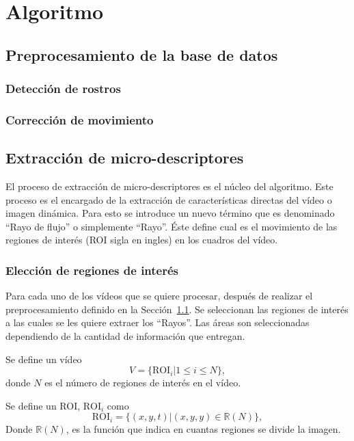 \chapter[Algoritmo]{Algoritmo}
\label{ch:algoritmo}

\section{Preprocesamiento de la base de datos}
\label{sec:proc_bdd}
	\subsection{Detección de rostros}
	\label{algoritmo:det_rostro}
	
	\subsection{Corrección de movimiento}
	\label{algoritmo:cor_movimiento}

\section{Extracción de micro-descriptores}
\label{sec:micro-descriptores}
		El proceso de extracción de micro-descriptores es el núcleo del algoritmo. Este proceso es el encargado de la extracción de características directas del vídeo o imagen dinámica. Para esto se introduce un nuevo término que es denominado ``Rayo de flujo'' o simplemente ``Rayo''. Éste define cual es el movimiento de las regiones de interés (ROI sigla en ingles) en los cuadros del vídeo.

	\subsection{Elección de regiones de interés}
	\label{algoritmo:elecc_roi}
	Para cada uno de los vídeos que se quiere procesar, después de realizar el preprocesamiento definido en la Sección~\ref{sec:proc_bdd}. Se seleccionan las regiones de interés a las cuales se les quiere extraer los ``Rayos''. Las áreas son seleccionadas dependiendo de la cantidad de información que entregan. 
	
	Se define un vídeo 
	\begin{equation}\label{algoritmo:eq:video}		
		V = \{\text{ROI}_i | 1 \leq i \le N\}, 
	\end{equation}
	donde $N$ es el número de regiones de interés en el vídeo.
	
	Se define un ROI, $\text{ROI}_i$ como
	\begin{equation}\label{algoritmo:eq:roi}
		\text{ROI}_i = \{(x,y,t) | (x,y,y) \in \mathds{R}(N)\},
	\end{equation}
	Donde $\mathds{R}(N)$, es la función que indica en cuantas regiones se divide la imagen.


